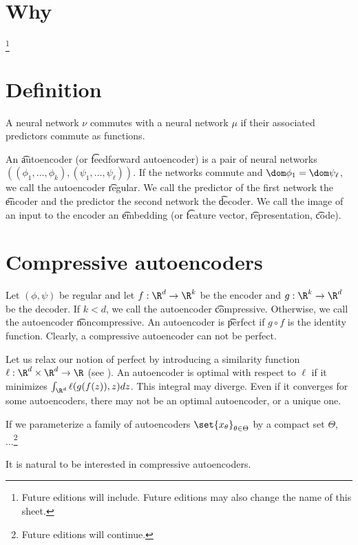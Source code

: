 
\section*{Why}
\footnote{Future editions will include. Future editions may also change the name of this sheet.}
\section*{Definition}

A neural network $\nu $ commutes with a neural network $\mu $ if their associated predictors commute as functions.

An \t{autoencoder} (or \t{feedforward autoencoder}) is a pair of neural networks $((\phi _1, \dots , \phi _k), (\psi _1, \dots , \psi _\ell ))$.
If the networks commute and $\dom \phi _1 = \dom \psi _\ell $, we call the autoencoder \t{regular}.
We call the predictor of the first network the \t{encoder} and the predictor the second network the \t{decoder}.
We call the image of an input to the encoder an \t{embedding} (or \t{feature vector}, \t{representation}, \t{code}).

\section*{Compressive autoencoders}

Let $(\phi , \psi )$ be regular and let $f: \R ^d \to \R ^k$ be the encoder and $g: \R ^k \to \R ^d$ be the decoder.
If $k < d$, we call the autoencoder \t{compressive}.
Otherwise, we call the autoencoder \t{noncompressive}.
An autoencoder is \t{perfect} if $g \circ f$ is the identity function.
Clearly, a compressive autoencoder can not be perfect.

Let us relax our notion of perfect by introducing a similarity function $\ell : \R ^d \times \R ^d \to \R $ (see ).
An autoencoder is optimal with respect to $\ell $ if it minimizes $\int_{\R ^d} \ell (g(f(z)), z) dz$.
This integral may diverge.
Even if it converges for some autoencoders, there may not be an optimal autoencoder, or a unique one.

If we parameterize a family of autoencoders $\set{x_{\theta }}_{\theta  \in \Theta }$ by a compact set $\Theta $, ...\footnote{Future editions will continue.}

It is natural to be interested in compressive autoencoders.

\blankpage